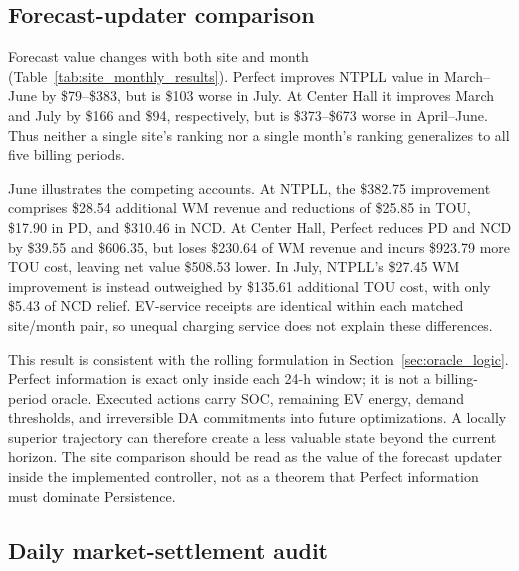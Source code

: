 \documentclass[final,5p,times]{elsarticle}
\begin{document}
\subsection{Forecast-updater comparison}
\label{sec:site_forecast_results}

Forecast value changes with both site and month (Table~\ref{tab:site_monthly_results}).
Perfect improves NTPLL value in March--June by \$79--\$383, but is
\$103 worse in July. At Center Hall it improves March and July by \$166
and \$94, respectively, but is \$373--\$673 worse in April--June.
Thus neither a single site's ranking nor a single month's ranking generalizes
to all five billing periods.

June illustrates the competing accounts. At NTPLL, the \$382.75 improvement
comprises \$28.54 additional WM revenue and reductions of \$25.85 in TOU,
\$17.90 in PD, and \$310.46 in NCD. At Center Hall, Perfect reduces PD and
NCD by \$39.55 and \$606.35, but loses \$230.64 of WM revenue and incurs
\$923.79 more TOU cost, leaving net value \$508.53 lower. In July, NTPLL's
\$27.45 WM improvement is instead outweighed by \$135.61 additional TOU
cost, with only \$5.43 of NCD relief. EV-service receipts are identical
within each matched site/month pair, so unequal charging service does not
explain these differences.

This result is consistent with the rolling formulation in
Section~\ref{sec:oracle_logic}. Perfect information is exact only inside each
24-h window; it is not a billing-period oracle. Executed actions carry SOC,
remaining EV energy, demand thresholds, and irreversible DA commitments into
future optimizations. A locally superior trajectory can therefore create a
less valuable state beyond the current horizon. The site comparison should be
read as the value of the forecast updater inside the implemented controller,
not as a theorem that Perfect information must dominate Persistence.



\subsection{Daily market-settlement audit}
\label{sec:site_daily_audit}
\end{document}
